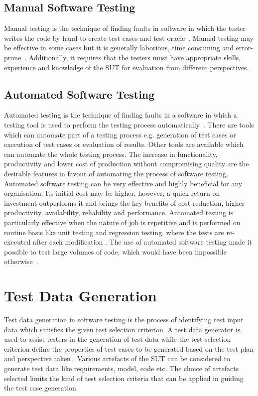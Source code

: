 \subsection{Manual Software Testing}
Manual testing is the technique of finding faults in software in which the tester writes the code by hand to create test cases and test oracle~\cite{Ciupa2008}. Manual testing may be effective in some cases but it is generally laborious, time consuming and error-prone~\cite{tretmans1999}. Additionally, it requires that the testers must have appropriate skills, experience and knowledge of the SUT for evaluation from different perspectives.
 
\subsection{Automated Software Testing}
Automated testing is the technique of finding faults in a software in which a testing tool is used to perform the testing process automatically~\cite{Leitner2007}. There are tools which can automate part of a testing process e.g. generation of test cases or execution of test cases or evaluation of results. Other tools are available which can automate the whole testing process. The increase in functionality, productivity and lower cost of production without compromising quality are the desirable features in favour of automating the process of software testing. Automated software testing can be very effective and highly beneficial for any organisation. Its initial cost may be higher, however, a quick return on investment outperforms it and brings the key benefits of cost reduction, higher productivity, availability, reliability and performance. Automated testing is particularly effective when the nature of job is repetitive and is performed on routine basis like unit testing and regression testing, where the tests are re-executed after each modification \cite{huang2003automated}. The use of automated software testing made it possible to test large volumes of code, which would have been impossible otherwise~\cite{ramamoorthy1975testing}.

\section{Test Data Generation}
Test data generation in software testing is the process of identifying test input data which satisfies the given test selection criterion. A test data generator is used to assist testers in the generation of test data while the test selection criterion define the properties of test cases to be generated based on the test plan and perspective taken \cite{korel1990}. Various artefacts of the SUT can be considered to generate test data like requirements, model, code etc. The choice of artefacts selected limits the kind of test selection criteria that can be applied in guiding the test case generation. 

